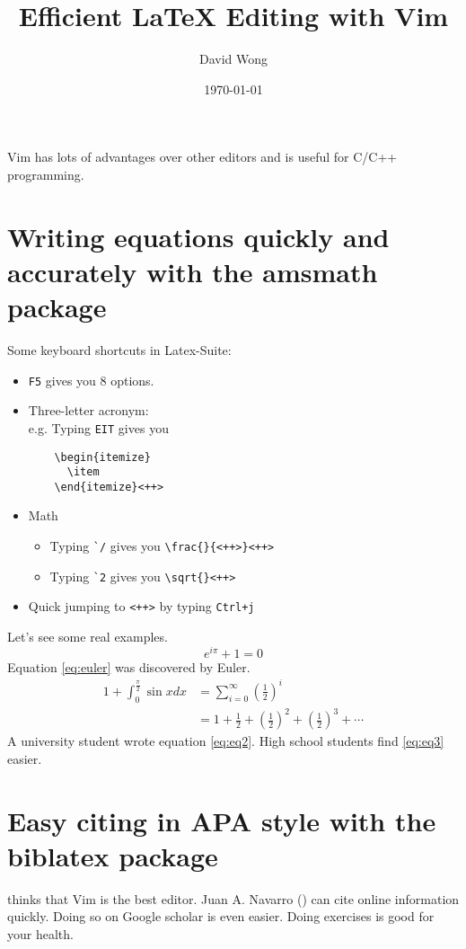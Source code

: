 \documentclass[a4paper]{article}
\title{Efficient \LaTeX{} Editing with Vim}
\author{David Wong}
\date{\today}
\begin{document}
\maketitle
Vim has lots of advantages over other editors and is useful for C/C++ programming. \parencite{lam}
\section{Writing equations quickly and accurately with the \textsf{amsmath} package}
Some keyboard shortcuts in Latex-Suite: \parencite{goerz2008}
\begin{itemize}
  \item \verb|F5| gives you 8 options.
  \item Three-letter acronym:\\
    e.g. Typing \verb|EIT| gives you
    \begin{verbatim}
    \begin{itemize}
      \item 
    \end{itemize}<++>
    \end{verbatim}
  \item Math
    \begin{itemize}
      \item Typing \verb|`/| gives you \verb|\frac{}{<++>}<++>|
      \item Typing \verb|`2| gives you \verb|\sqrt{}<++>|
    \end{itemize}
  \item Quick jumping to \verb|<++>| by typing \verb|Ctrl+j|
\end{itemize}
Let's see some real examples.
\begin{equation}
  e^{i\pi}+1=0
  \label{eq:euler}
\end{equation}
Equation \eqref{eq:euler} was discovered by Euler.
\begin{align}
  1+\int_{0}^{\frac{\pi}{2}} \sin x dx &= \sum_{i=0}^{\infty} \left(\frac{1}{2}\right)^i \label{eq:eq2}\\
  &= 1 + \frac{1}{2} + \left(\frac{1}{2}\right)^2 + \left(\frac{1}{2}\right)^3 + \cdots \label{eq:eq3}
\end{align}
A university student wrote equation \eqref{eq:eq2}. High school students find \eqref{eq:eq3} easier.
\section{Easy citing in APA style with the \textsf{biblatex} package}
\textcite{oualline2001} thinks that Vim is the best editor. Juan A. Navarro (\citeyear{citeurl2013}) can cite online information quickly. Doing so on Google scholar is even easier. Doing exercises is good for your health. \parencite{wilmore2004physiology}
\printbibliography
\end{document}
